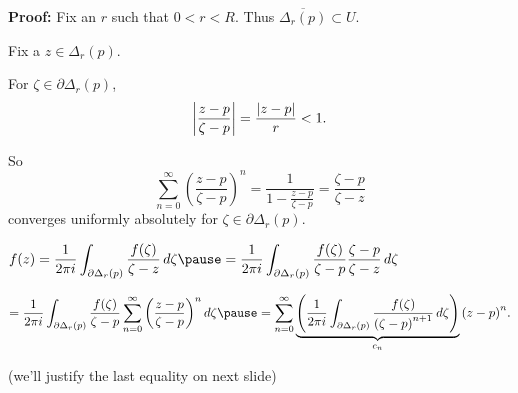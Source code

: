 \documentclass[10pt,aspectratio=169]{beamer}
\begin{document}
\begin{frame}

\textbf{Proof:}
Fix an $r$ such that $0 < r < R$.
\pause
Thus $\overline{\Delta_r(p)} \subset U$.

\pause
\medskip

Fix a $z \in \Delta_r(p)$.

\pause
\medskip

For $\zeta \in \partial \Delta_r(p)$, 
\begin{equation*}
\left\lvert {\frac{z-p}{\zeta-p}} \right\rvert =
\frac{\lvert {z-p} \rvert}{r} < 1 .
\end{equation*}

\pause

So
\begin{equation*}
\sum_{n=0}^\infty
{\left(\frac{z-p}{\zeta-p}\right)}^n
=
\frac{1}{1-\frac{z-p}{\zeta-p}}
=
\frac{\zeta-p}{\zeta-z}
\end{equation*}
converges uniformly absolutely for $\zeta \in \partial \Delta_r(p)$.

\pause
\medskip

$\displaystyle
f(z)
=
\frac{1}{2\pi i}
\int_{\partial \Delta_r(p)}
\frac{f(\zeta)}{\zeta-z}
\,
d \zeta 
\pause
=
\frac{1}{2\pi i}
\int_{\partial \Delta_r(p)}
\frac{f(\zeta)}{\zeta-p}
\frac{\zeta-p}{\zeta-z}
\,
d \zeta 
$

\medskip
\pause

\hspace*{0.5in}$\displaystyle
=
\frac{1}{2\pi i}
\int_{\partial \Delta_r(p)}
\frac{f(\zeta)}{\zeta-p}
\sum_{n=0}^\infty
{\left(\frac{z-p}{\zeta-p}\right)}^n
\,
d \zeta 
\pause
=
\sum_{n=0}^\infty
\underbrace{
\left(
\frac{1}{2\pi i}
\int_{\partial \Delta_r(p)}
\frac{f(\zeta)}{{(\zeta-p)}^{n+1}}
\,
d \zeta 
\right)
}_{c_n}
{(z-p)}^n .
$

(we'll justify the last equality on next slide)

\end{frame}
\end{document}
